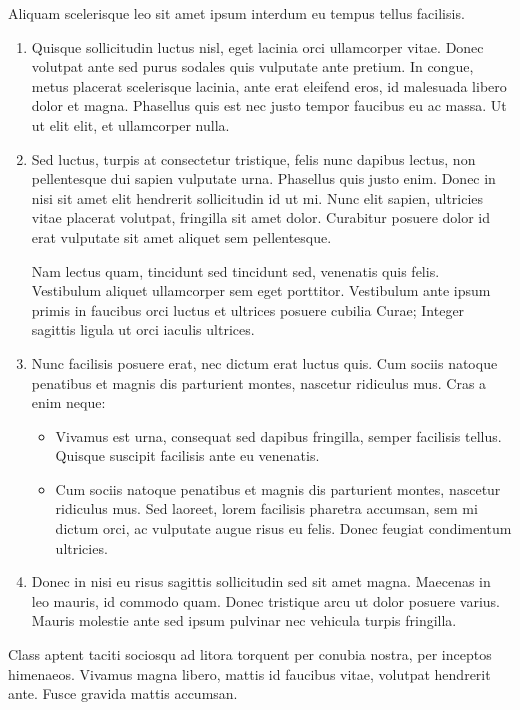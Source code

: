 \documentclass[eprint]{actapoly}
\begin{document}
Aliquam scelerisque leo sit amet ipsum interdum eu tempus tellus facilisis.
\begin{enumerate}

\item
Quisque sollicitudin luctus nisl, eget lacinia orci ullamcorper vitae.
Donec volutpat ante sed purus sodales quis vulputate ante pretium.
In congue, metus placerat scelerisque lacinia, ante erat eleifend eros, id malesuada libero dolor et magna.
Phasellus quis est nec justo tempor faucibus eu ac massa.
Ut ut elit elit, et ullamcorper nulla.

\item
Sed luctus, turpis at consectetur tristique, felis nunc dapibus lectus, non pellentesque dui sapien vulputate urna.
Phasellus quis justo enim.
Donec in nisi sit amet elit hendrerit sollicitudin id ut mi.
Nunc elit sapien, ultricies vitae placerat volutpat, fringilla sit amet dolor.
Curabitur posuere dolor id erat vulputate sit amet aliquet sem pellentesque.

Nam lectus quam, tincidunt sed tincidunt sed, venenatis quis felis.
Vestibulum aliquet ullamcorper sem eget porttitor.
Vestibulum ante ipsum primis in faucibus orci luctus et ultrices posuere cubilia Curae;
 Integer sagittis ligula ut orci iaculis ultrices.

\item
Nunc facilisis posuere erat, nec dictum erat luctus quis.
Cum sociis natoque penatibus et magnis dis parturient montes, nascetur ridiculus mus.
Cras a enim neque:
 \begin{itemize}
 \item Vivamus est urna, consequat sed dapibus fringilla, semper facilisis tellus.
 Quisque suscipit facilisis ante eu venenatis.
 \item Cum sociis natoque penatibus et magnis dis parturient montes, nascetur ridiculus mus.
 Sed laoreet, lorem facilisis pharetra accumsan, sem mi dictum orci, ac vulputate augue risus eu felis.
 Donec feugiat condimentum ultricies.
 \end{itemize}

\item
Donec in nisi eu risus sagittis sollicitudin sed sit amet magna.
Maecenas in leo mauris, id commodo quam.
Donec tristique arcu ut dolor posuere varius.
Mauris molestie ante sed ipsum pulvinar nec vehicula turpis fringilla.

\end{enumerate}
Class aptent taciti sociosqu ad litora torquent per conubia nostra, per inceptos himenaeos.
Vivamus magna libero, mattis id faucibus vitae, volutpat hendrerit ante.
Fusce gravida mattis accumsan.
\end{document}
